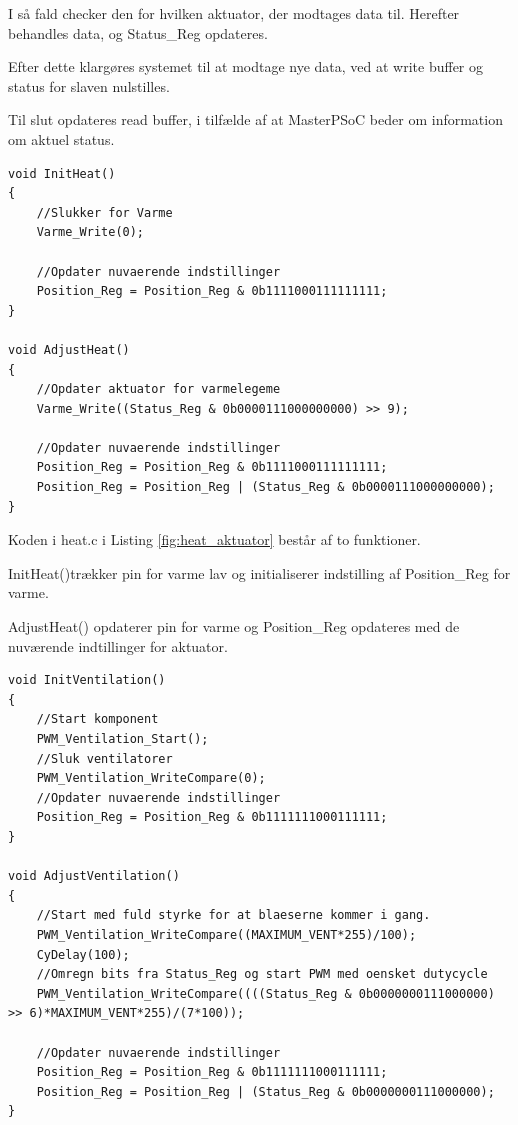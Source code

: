I så fald checker den for hvilken aktuator, der modtages data til.
Herefter behandles data, og Status\_Reg opdateres.

Efter dette klargøres systemet til at modtage nye data, ved at write buffer og status for slaven nulstilles.

Til slut opdateres read buffer, i tilfælde af at MasterPSoC beder om information om aktuel status. 
\newline
\begin{lstlisting}[caption=Udsnit af heat.c for PSoC4 i Aktuator, label=fig:heat_aktuator]
void InitHeat()
{   
    //Slukker for Varme
    Varme_Write(0);
    
    //Opdater nuvaerende indstillinger
    Position_Reg = Position_Reg & 0b1111000111111111;
}

void AdjustHeat()
{
    //Opdater aktuator for varmelegeme
    Varme_Write((Status_Reg & 0b0000111000000000) >> 9);
    
    //Opdater nuvaerende indstillinger
    Position_Reg = Position_Reg & 0b1111000111111111;
    Position_Reg = Position_Reg | (Status_Reg & 0b0000111000000000);
}
\end{lstlisting}

Koden i heat.c i Listing \ref{fig:heat_aktuator} består af to funktioner. 

InitHeat()trækker pin for varme lav og initialiserer indstilling af Position\_Reg for varme.

AdjustHeat() opdaterer pin for varme og Position\_Reg opdateres med de nuværende indtillinger for aktuator. 

\clearpage

\begin{lstlisting}[caption=Udsnit af ventilation.c for PSoC4 i Aktuator, label=fig:ventilation_aktuator]
void InitVentilation()
{
    //Start komponent
    PWM_Ventilation_Start();
    //Sluk ventilatorer
    PWM_Ventilation_WriteCompare(0);
    //Opdater nuvaerende indstillinger
    Position_Reg = Position_Reg & 0b1111111000111111;
}

void AdjustVentilation()
{
    //Start med fuld styrke for at blaeserne kommer i gang.
    PWM_Ventilation_WriteCompare((MAXIMUM_VENT*255)/100);
    CyDelay(100);
    //Omregn bits fra Status_Reg og start PWM med oensket dutycycle
    PWM_Ventilation_WriteCompare((((Status_Reg & 0b0000000111000000) >> 6)*MAXIMUM_VENT*255)/(7*100));
    
    //Opdater nuvaerende indstillinger
    Position_Reg = Position_Reg & 0b1111111000111111;
    Position_Reg = Position_Reg | (Status_Reg & 0b0000000111000000);
}
\end{lstlisting}

